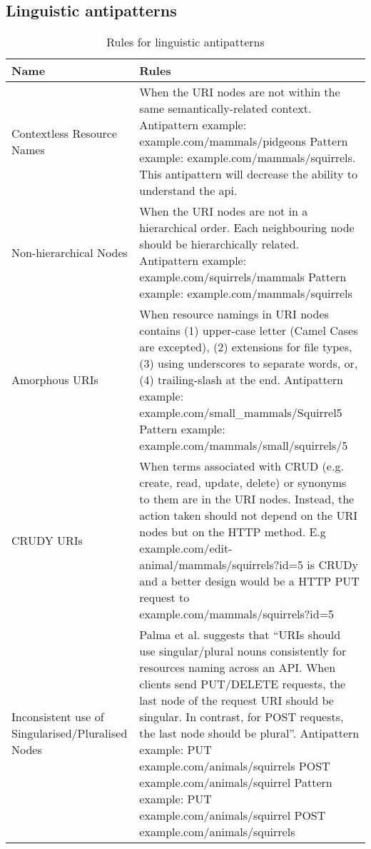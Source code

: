 \documentclass[a4paper,12pt]{article}
\begin{document}
\subsection{Linguistic antipatterns}

\begin{center}
\begin{table}[!ht]
\begin{tabular}{|p{30mm}|p{105mm}|}
\hline \textbf{Name} & \textbf{Rules} \\
\hline 
Contextless Resource Names &
When the URI nodes are not within the same semantically-related context. Antipattern example: 
example.com/mammals/pidgeons
Pattern example:
example.com/mammals/squirrels.
This antipattern will decrease the ability to understand the api.
\\ \hline
Non-hierarchical Nodes &
When the URI nodes are not in a hierarchical order. Each neighbouring node should be hierarchically related. Antipattern example: 
example.com/squirrels/mammals
Pattern example:
example.com/mammals/squirrels
\\ \hline
Amorphous URIs &
When resource namings in URI nodes contains (1) upper-case letter (Camel Cases are excepted), (2)  extensions for file types, (3) using underscores to separate words, or, (4) trailing-slash at the end. Antipattern example:
example.com/small\_mammals/Squirrel5
Pattern example:
example.com/mammals/small/squirrels/5
\\ \hline
CRUDY URIs &
When terms associated with CRUD (e.g. create, read, update, delete) or synonyms to them are in the URI nodes. Instead, the action taken should not depend on the URI nodes but on the HTTP method. E.g example.com/edit-animal/mammals/squirrels?id=5 is CRUDy and a better design would be a HTTP PUT request to example.com/mammals/squirrels?id=5
\\ \hline
Inconsistent use of Singularised/Pluralised Nodes &
Palma et al. \cite{linguistic} suggests that “URIs should use singular/plural nouns consistently for resources naming across an
API. When clients send PUT/DELETE requests, the last node of the request URI
should be singular. In contrast, for POST requests, the last node should be plural”.
Antipattern example:
PUT example.com/animals/squirrels
POST example.com/animals/squirrel
Pattern example:
PUT example.com/animals/squirrel
POST example.com/animals/squirrels
\\ \hline
\end{tabular}
    \caption{Rules for linguistic antipatterns}
    \label{tab:Rules for linguistic antipatterns}
\end{table}
\end{center}
\end{document}
